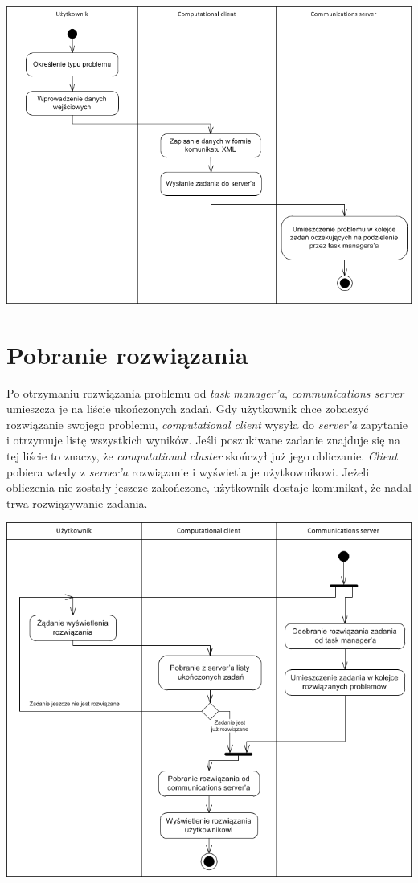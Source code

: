 \documentclass[12pt,a4paper,titlepage]{report}
\begin{document}
	\includegraphics[width=\textwidth]{img/activityDiagramClient1.png}
	
	\section{Pobranie rozwiązania}	
	Po otrzymaniu rozwiązania problemu od \emph{task manager'a}, \emph{communications server} umieszcza je na liście ukończonych zadań. Gdy użytkownik chce zobaczyć rozwiązanie swojego problemu, \emph{computational client} wysyła do \emph{server'a} zapytanie i otrzymuje listę wszystkich wyników. Jeśli poszukiwane zadanie znajduje się na tej liście to znaczy, że \emph{computational cluster} skończył już jego obliczanie. \emph{Client} pobiera wtedy z \emph{server'a} rozwiązanie i wyświetla je użytkownikowi. Jeżeli obliczenia nie zostały jeszcze zakończone, użytkownik dostaje komunikat, że nadal trwa rozwiązywanie zadania.
	
	\includegraphics[width=\textwidth]{img/activityDiagramClient2.png}
	
\end{document}
